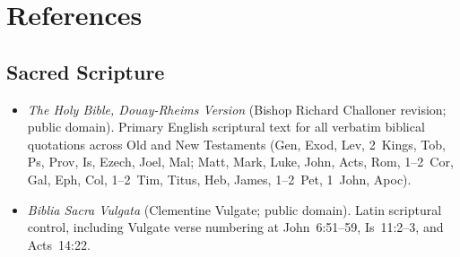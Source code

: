 \section{References}
\label{sec:references}

\subsection{Sacred Scripture}
\begin{itemize}
\item \emph{The Holy Bible, Douay-Rheims Version} (Bishop Richard Challoner revision; public domain). Primary English scriptural text for all verbatim biblical quotations across Old and New Testaments (Gen, Exod, Lev, 2~Kings, Tob, Ps, Prov, Is, Ezech, Joel, Mal; Matt, Mark, Luke, John, Acts, Rom, 1--2~Cor, Gal, Eph, Col, 1--2~Tim, Titus, Heb, James, 1--2~Pet, 1~John, Apoc).
\item \emph{Biblia Sacra Vulgata} (Clementine Vulgate; public domain). Latin scriptural control, including Vulgate verse numbering at John~6:51--59, Is~11:2--3, and Acts~14:22.
\end{itemize}

